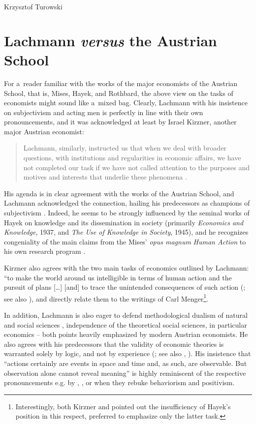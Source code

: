 \begin{artengenv}{Krzysztof Turowski}
\section{Lachmann \emph{versus} the Austrian School}

For a~reader familiar with the works of the major economists of the Austrian School, that is, Mises, Hayek, and Rothbard, the above view on the tasks of economists might sound like a~mixed bag.
Clearly, Lachmann with his insistence on subjectivism and acting men is perfectly in line with their own pronouncements, and it was acknowledged at least by Israel Kirzner, another major Austrian economist:
\begin{quote}
Lachmann, similarly, instructed us that when we deal with broader questions, with institutions and regularities in economic affairs, we have not completed our task if we have not called attention to the purposes and motives and interests that underlie these phenomena \parencite[46]{kirzner-method}.
\end{quote}
His agenda is in clear agreement with the works of the Austrian School, and Lachmann acknowledged the connection, hailing his predecessors as champions of subjectivism \parencite[28]{lachmann-crisis}.
Indeed, he seems to be strongly influenced by the seminal works of Hayek on knowledge and its dissemination in society (primarily \emph{Economics and Knowledge}, 1937, and \emph{The Use of Knowledge in Society}, 1945), and he recognizes congeniality of the main claims from the Mises' \emph{opus magnum} \emph{Human Action} to his own research program \parencite[56--57]{lachmann-kaleidic}.

Kirzner also agrees with the two main tasks of economics outlined by Lachmann: ``to make the world around us intelligible in terms of human action and the pursuit of plans [\ldots] [and] to trace the unintended consequences of such action (\cite[41]{kirzner-method}; see also \cite[261--262]{lachmann-hicks-neo}), and directly relate them to the writings of Carl Menger\footnote{Interestingly, both Kirzner and \textcite[66--67]{rothbard-praxeology} pointed out the insufficiency of Hayek's position in this respect, preferred to emphasize only the latter task.}.

In addition, Lachmann is also eager to defend methodological dualism of natural and social sciences \parencite[167--168]{lachmann-science}, independence of the theoretical social sciences, in particular economics \parencite[59]{lachmann-significance} -- both points heavily emphasized by modern Austrian economists.
He also agrees with his predecessors that the validity of economic theories is warranted solely by logic, and not by experience (\cite[58]{lachmann-significance}; see also \cite[41]{mises-ha}, \cite[21, 31--32]{rothbard-praxeology}).
His insistence that ``actions certainly are events in space and time and, as such, are observable. But observation alone cannot reveal meaning'' \parencite[58]{lachmann-significance} is highly reminiscent of the respective pronouncements e.g. by \textcite[26]{mises-ha}, \citeyear[245]{mises-theory}, or \textcite[63--64]{hoppe} when they rebuke behaviorism and positivism.


\end{artengenv}
